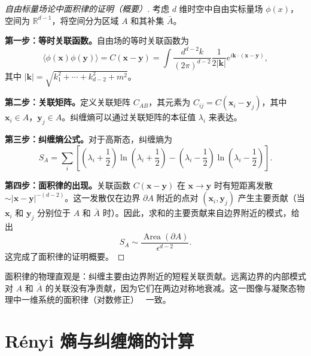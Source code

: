 \begin{proof}[自由标量场论中面积律的证明（概要）]
考虑 $d$ 维时空中自由实标量场 $\phi(x)$，空间为 $\mathbb{R}^{d-1}$，将空间分为区域 $A$ 和其补集 $\bar{A}$。

\textbf{第一步：等时关联函数。}自由场的等时关联函数为
\begin{equation}
    \langle\phi(\mathbf{x})\phi(\mathbf{y})\rangle = C(\mathbf{x}-\mathbf{y}) = \int \frac{d^{d-2}k}{(2\pi)^{d-2}} \frac{1}{2|\mathbf{k}|} e^{i\mathbf{k}\cdot(\mathbf{x}-\mathbf{y})},
\end{equation}
其中 $|\mathbf{k}| = \sqrt{k_1^2 + \cdots + k_{d-2}^2 + m^2}$。

\textbf{第二步：关联矩阵。}定义关联矩阵 $C_{AB}$，其元素为 $C_{ij} = C(\mathbf{x}_i - \mathbf{y}_j)$，其中 $\mathbf{x}_i \in A$，$\mathbf{y}_j \in A$。纠缠熵可以通过关联矩阵的本征值 $\lambda_i$ 来表达。

\textbf{第三步：纠缠熵公式。}对于高斯态，纠缠熵为
\begin{equation}
    S_A = \sum_i \left[\left(\lambda_i + \frac{1}{2}\right)\ln\left(\lambda_i + \frac{1}{2}\right) - \left(\lambda_i - \frac{1}{2}\right)\ln\left(\lambda_i - \frac{1}{2}\right)\right].
\end{equation}

\textbf{第四步：面积律的出现。}关联函数 $C(\mathbf{x}-\mathbf{y})$ 在 $\mathbf{x} \to \mathbf{y}$ 时有短距离发散 $\sim |\mathbf{x}-\mathbf{y}|^{-(d-2)}$。这一发散仅在边界 $\partial A$ 附近的点对 $(\mathbf{x}_i, \mathbf{y}_j)$ 产生主要贡献（当 $\mathbf{x}_i$ 和 $\mathbf{y}_j$ 分别位于 $A$ 和 $\bar{A}$ 时）。因此，求和的主要贡献来自边界附近的模式，给出
\begin{equation}
    S_A \sim \frac{\operatorname{Area}(\partial A)}{\epsilon^{d-2}}.
\end{equation}
这完成了面积律的证明概要。
\end{proof}

\begin{remark}
面积律的物理直观是：纠缠主要由边界附近的短程关联贡献。远离边界的内部模式对 $A$ 和 $\bar{A}$ 的关联没有净贡献，因为它们在两边对称地衰减。这一图像与凝聚态物理中一维系统的面积律（对数修正）~\cite{Calabrese2004} 一致。
\end{remark}

\section{Rényi 熵与纠缠熵的计算}

